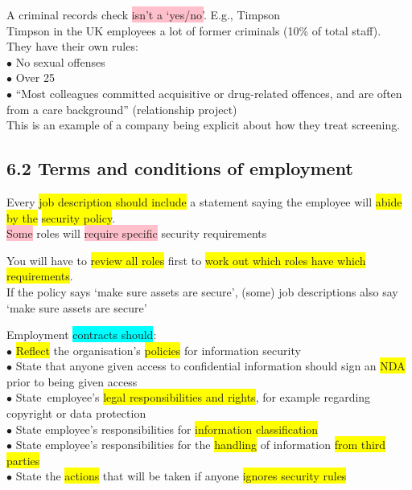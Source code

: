 \documentclass[tikz,border=10pt]{project_plan}
\newcommand{\bulletPoint}{\hspace{-3.1pt}$\bullet$ \hspace{5pt}}
\begin{document}
A criminal records check \colorbox{pink}{isn’t a ‘yes/no’}. E.g., Timpson\\
Timpson in the UK employees a lot of former criminals (10\% of total staff). \\
They have their own rules:\\
\bulletPoint No sexual offenses\\
\bulletPoint Over 25 \\
\bulletPoint “Most colleagues committed acquisitive or drug-related offences,
and are often from a care background” (relationship project)\\
This is an example of a company being explicit about how they treat screening.

\subsection{6.2 Terms and conditions of employment}

Every \colorbox{yellow}{job description should include} a statement saying the employee will \colorbox{yellow}{abide by the} \colorbox{yellow}{security policy}. \\
\colorbox{pink}{Some} roles will \colorbox{pink}{require specific} security requirements

You will have to \colorbox{yellow}{review all roles} first to \colorbox{yellow}{work out which roles have which requirements}. \\
If the policy says ‘make sure assets are secure’, (some) job descriptions also say ‘make sure assets are secure’

Employment \colorbox{cyan}{contracts should}:\\
\bulletPoint \colorbox{yellow}{Reflect} the organisation’s \colorbox{yellow}{policies} for information security\\
\bulletPoint State that anyone given access to confidential information should sign an \colorbox{yellow}{NDA} prior to being given access\\
\bulletPoint State employee’s \colorbox{yellow}{legal responsibilities and rights}, for example regarding copyright or data protection\\
\bulletPoint State employee’s responsibilities for \colorbox{yellow}{information classification}\\
\bulletPoint State employee’s  responsibilities for the \colorbox{yellow}{handling} of information \colorbox{yellow}{from third parties}\\
\bulletPoint State the \colorbox{yellow}{actions} that will be taken if anyone \colorbox{yellow}{ignores security rules}
\end{document}
